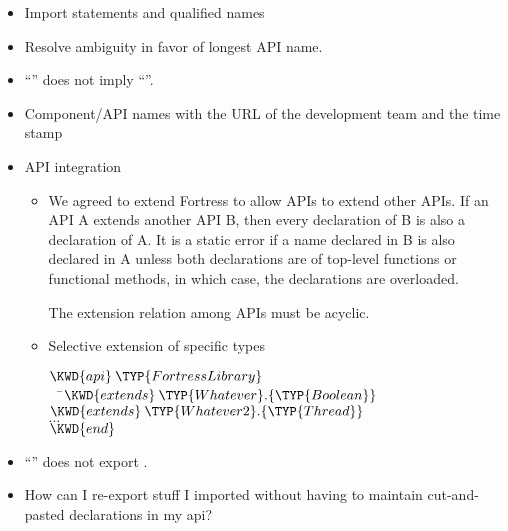 \begin{itemize}
\begin{itemize}
\item Import statements and qualified names%

\item Resolve ambiguity in favor of longest API name.

 \item ``'' does not imply
 ``''.

\item Component/API names with the URL of the development team and the time stamp

 \item API integration
  \begin{itemize}
\item
We agreed to extend Fortress to allow APIs to extend other APIs.  If an API A extends another API B, then every declaration of B is also a declaration of A.  It is a static error if a name declared in B is also declared in A unless both declarations are of top-level functions or functional methods, in which case, the declarations are overloaded.

The extension relation among APIs must be acyclic.
\item Selective extension of specific types
\begin{Fortress}
\(\KWD{api}\:\TYP{FortressLibrary}\)\\
{\tt~~}\pushtabs\=\+\(  \KWD{extends}\:\TYP{Whatever}.\{\TYP{Boolean}\}\)\\
\(  \KWD{extends}\:\TYP{Whatever2}.\{\TYP{Thread}\}\)\\
\(  \ldots\)\-\\\poptabs
\(\KWD{end}\)
\end{Fortress}
  \end{itemize}

 \item ``''
 does not export .
\item How can I re-export stuff I
imported without having to maintain cut-and-pasted declarations in my api?




\end{itemize}
\end{itemize}
